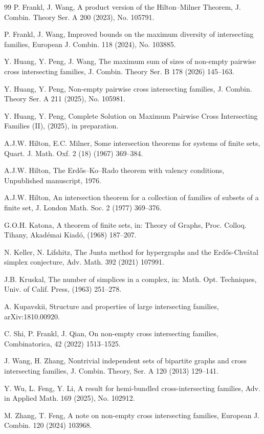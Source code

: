 \documentclass[a4paper,11pt]{article}
\begin{document}
\begin{thebibliography}{99}
 P. Frankl, J. Wang,
 A product version of the Hilton--Milner Theorem,
 J. Combin. Theory Ser. A 200 (2023), No. 105791.


  P. Frankl, J. Wang,
 Improved bounds on the maximum diversity of intersecting families,
European J. Combin. 118 (2024), No. 103885.


Y. Huang, Y. Peng, J. Wang,
The maximum sum of sizes of non-empty pairwise cross intersecting families,
J. Combin. Theory Ser. B 178 (2026) 145--163.

Y. Huang, Y. Peng,
Non-empty pairwise cross intersecting families,
J. Combin. Theory Ser. A 211 (2025), No. 105981.


Y. Huang, Y. Peng,
Complete Solution on Maximum Pairwise Cross Intersecting Families (II), (2025), in preparation.

A.J.W. Hilton, E.C. Milner,
Some intersection theorems for systems of finite
sets, Quart. J. Math. Oxf. 2 (18) (1967) 369--384.

A.J.W. Hilton,
The Erd\H{o}s--Ko--Rado theorem with valency conditions,
Unpublished manuscript, 1976.

A.J.W. Hilton, An intersection theorem for a collection of families of subsets of a finite set, J. London Math. Soc. 2 (1977) 369--376.



G.O.H. Katona, A theorem of finite sets, in: Theory of Graphs, Proc. Colloq.
Tihany, Akad\'emai Kiad\'o, (1968) 187--207.

N. Keller, N. Lifshitz,
The Junta method for hypergraphs and the Erd\H os-Chv\'atal simplex conjecture, Adv. Math. 392 (2021) 107991.

J.B. Kruskal,
The number of simplices in a complex, in: Math. Opt. Techniques,
Univ. of Calif. Press, (1963) 251--278.

A. Kupavskii,
Structure and properties of large intersecting families,
arXiv:1810.00920.


C. Shi, P. Frankl, J. Qian,
On non-empty cross intersecting families, Combinatorica, 42 (2022) 1513--1525.

 J. Wang, H. Zhang,
 Nontrivial independent sets of bipartite graphs and cross intersecting families, J. Combin. Theory, Ser. A 120 (2013) 129--141.


 Y. Wu, L. Feng, Y. Li,
 A result for hemi-bundled cross-intersecting families,
 Adv. in Applied Math. 169 (2025), No. 102912.

M. Zhang, T. Feng,
A note on non-empty cross intersecting families, European J. Combin. 120 (2024) 103968.


\end{thebibliography}
\end{document}
